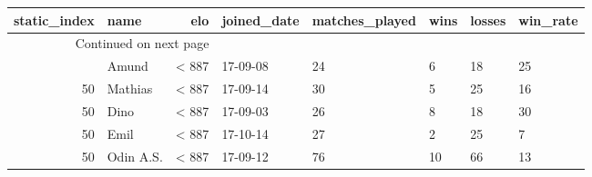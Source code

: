 \begin{longtable}{|r|l|r|l|l|l|l|l|}
\toprule
 static\_index &       name &    elo & joined\_date &  matches\_played &  wins &  losses &  win\_rate \\
\midrule
\endhead
\midrule
\multicolumn{3}{r}{{Continued on next page}} \\
\midrule
\endfoot

\bottomrule
\endlastfoot
           50 &      Amund &  < 887 &    17-09-08 &              24 &     6 &      18 &        25 \\
           50 &    Mathias &  < 887 &    17-09-14 &              30 &     5 &      25 &        16 \\
           50 &       Dino &  < 887 &    17-09-03 &              26 &     8 &      18 &        30 \\
           50 &       Emil &  < 887 &    17-10-14 &              27 &     2 &      25 &         7 \\
           50 &  Odin A.S. &  < 887 &    17-09-12 &              76 &    10 &      66 &        13 \\
\end{longtable}
